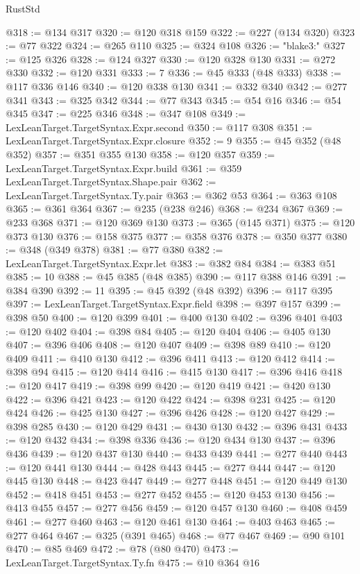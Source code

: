 \begin{lexlean}{RustStd}
\begin{coremodule}
@318 := @134 @317
@320 := @120 @318 @159
@322 := @227 (@134 @320)
@323 := @77 @322
@324 := @265 @110
@325 := @324 @108
@326 := "blake3:"
@327 := @125 @326
@328 := @124 @327
@330 := @120 @328 @130
@331 := @272 @330
@332 := @120 @331
@333 := 7
@336 := @45 @333 (@48 @333)
@338 := @117 @336 @146
@340 := @120 @338 @130
@341 := @332 @340
@342 := @277 @341
@343 := @325 @342
@344 := @77 @343
@345 := @54 @16
@346 := @54 @345
@347 := @225 @346
@348 := @347 @108
@349 := LexLeanTarget.TargetSyntax.Expr.second
@350 := @117 @308
@351 := LexLeanTarget.TargetSyntax.Expr.closure
@352 := 9
@355 := @45 @352 (@48 @352)
@357 := @351 @355 @130
@358 := @120 @357
@359 := LexLeanTarget.TargetSyntax.Expr.build
@361 := @359 LexLeanTarget.TargetSyntax.Shape.pair
@362 := LexLeanTarget.TargetSyntax.Ty.pair
@363 := @362 @53
@364 := @363 @108
@365 := @361 @364
@367 := @235 (@238 @246)
@368 := @234 @367
@369 := @233 @368
@371 := @120 @369 @130
@373 := @365 (@145 @371)
@375 := @120 @373 @130
@376 := @158 @375
@377 := @358 @376
@378 := @350 @377
@380 := @348 (@349 @378)
@381 := @77 @380
@382 := LexLeanTarget.TargetSyntax.Expr.let
@383 := @382 @84
@384 := @383 @51
@385 := 10
@388 := @45 @385 (@48 @385)
@390 := @117 @388 @146
@391 := @384 @390
@392 := 11
@395 := @45 @392 (@48 @392)
@396 := @117 @395
@397 := LexLeanTarget.TargetSyntax.Expr.field
@398 := @397 @157
@399 := @398 @50
@400 := @120 @399
@401 := @400 @130
@402 := @396 @401
@403 := @120 @402
@404 := @398 @84
@405 := @120 @404
@406 := @405 @130
@407 := @396 @406
@408 := @120 @407
@409 := @398 @89
@410 := @120 @409
@411 := @410 @130
@412 := @396 @411
@413 := @120 @412
@414 := @398 @94
@415 := @120 @414
@416 := @415 @130
@417 := @396 @416
@418 := @120 @417
@419 := @398 @99
@420 := @120 @419
@421 := @420 @130
@422 := @396 @421
@423 := @120 @422
@424 := @398 @231
@425 := @120 @424
@426 := @425 @130
@427 := @396 @426
@428 := @120 @427
@429 := @398 @285
@430 := @120 @429
@431 := @430 @130
@432 := @396 @431
@433 := @120 @432
@434 := @398 @336
@436 := @120 @434 @130
@437 := @396 @436
@439 := @120 @437 @130
@440 := @433 @439
@441 := @277 @440
@443 := @120 @441 @130
@444 := @428 @443
@445 := @277 @444
@447 := @120 @445 @130
@448 := @423 @447
@449 := @277 @448
@451 := @120 @449 @130
@452 := @418 @451
@453 := @277 @452
@455 := @120 @453 @130
@456 := @413 @455
@457 := @277 @456
@459 := @120 @457 @130
@460 := @408 @459
@461 := @277 @460
@463 := @120 @461 @130
@464 := @403 @463
@465 := @277 @464
@467 := @325 (@391 @465)
@468 := @77 @467
@469 := @90 @101
@470 := @85 @469
@472 := @78 (@80 @470)
@473 := LexLeanTarget.TargetSyntax.Ty.fn
@475 := @10 @364 @16

\end{coremodule}
\end{lexlean}
